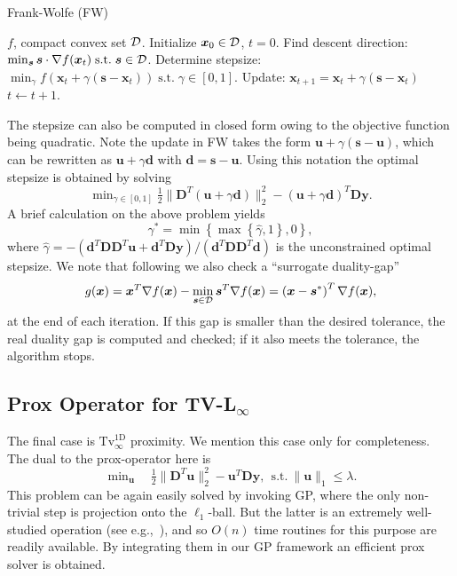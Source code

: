\documentclass[twoside,11pt]{article}
\newcommand{\vd}{\bm{d}}       \newcommand{\vdh}{\hat{\bm{d}}}        \newcommand{\dhat}{\hat{d}}  \newcommand{\vdt}{\tilde{\bm{d}}}       \newcommand{\dt}{\tilde{d}}
\newcommand{\vs}{\bm{s}}       \newcommand{\vsh}{\hat{\bm{s}}}        \newcommand{\sh}{\hat{s}}    \newcommand{\vst}{\tilde{\bm{s}}}       \newcommand{\st}{\tilde{s}}
\newcommand{\vu}{\bm{u}}       \newcommand{\vuh}{\hat{\bm{u}}}        \newcommand{\uh}{\hat{u}}    \newcommand{\vut}{\tilde{\bm{u}}}       \newcommand{\ut}{\tilde{u}}
\newcommand{\vx}{\bm{x}}       \newcommand{\vxh}{\hat{\bm{x}}}        \newcommand{\xh}{\hat{x}}    \newcommand{\vxt}{\tilde{\bm{x}}}       \newcommand{\xt}{\tilde{x}}
\newcommand{\vy}{\bm{y}}       \newcommand{\vyh}{\hat{\bm{y}}}        \newcommand{\yh}{\hat{y}}    \newcommand{\vyt}{\tilde{\bm{y}}}       \newcommand{\yt}{\tilde{y}}
\newcommand{\md}{\bm{D}}
\newcommand{\mynorm}[2]{\| {#1} \|_{#2}}
\newcommand{\norm}[2]{\mynorm{#1}{#2}}
\newcommand{\enorm}[1]{\mynorm{#1}{2}}
\newcommand{\nlmin}{\min\nolimits}
\newcommand{\half}{\tfrac{1}{2}}
\newcommand{\tvell}{\text{Tv}}
\newcommand{\oned}{\text{1D}}
\numberwithin{equation}{section}
\numberwithin{theorem}{section}
\begin{document}
\begin{algorithm}[htbp]
 \caption{
    \label{alg:FW}
    Frank-Wolfe (FW)
 }
 \begin{algorithmic}
   $f$, compact convex set ${\cal D}$.
  \State Initialize $\vx_0 \in {\cal D}$, $t=0$.
   \State Find descent direction: $\min_{\vs} \vs \cdot \nabla f (\vx_t) \; \text{s.t.} \; \vs \in {\cal D}$.
   \State Determine stepsize: $\min_{\gamma} f(\vx_t + \gamma (\vs - \vx_t)) \; \text{s.t.} \; \gamma \in [0, 1]$.
   \State Update: $\vx_{t+1} = \vx_t + \gamma (\vs - \vx_t)$
   \State $t \gets t+1$.
  \EndWhile
  \State\Return{$\vx_t$.}
 \end{algorithmic}
\end{algorithm}

The stepsize can also be computed in closed form owing to the objective function being quadratic. Note the update in FW  takes the form $\vu + \gamma (\vs - \vu)$, which can be rewritten as $\vu + \gamma \vd$ with $\vd = \vs - \vu$. Using this notation the optimal stepsize is obtained by solving
\begin{equation*}
 \nlmin_{\gamma \in [0, 1]} \half \enorm{\md^T (\vu + \gamma \vd)}^2 - \left( \vu + \gamma \vd\right)^T \md \vy.
\end{equation*}
A brief calculation on the above problem yields %
\begin{equation*}
 \gamma^* = \min \left\lbrace \max \left\lbrace \hat\gamma, 1 \right\rbrace, 0 \right\rbrace,
\end{equation*}
where $\hat{\gamma} = - (\vd^T \md \md^T \vu + \vd^T \md \vy)/(\vd^T \md \md^T \vd)$ is the unconstrained optimal stepsize. We note that following \citep{JaggiFW} we
also check a ``surrogate duality-gap''
\begin{equation*}
 g(\vx)  = \vx^T \nabla f(\vx) - \min_{\vs \in {\cal D}} \vs^T \nabla f(\vx)
         = \left( \vx - \vs^* \right)^T \nabla f(\vx),
\end{equation*}
at the end of each iteration. If this gap is smaller than the desired tolerance, the real duality gap is computed and checked; if it also meets the tolerance, the algorithm stops.

\subsection{Prox Operator for TV-L$_\infty$}
The final case is $\tvell_{\infty}^{\oned}$ proximity. We mention this case only for completeness. The dual to the prox-operator here is
\begin{equation}
  \label{eq:20}
  \nlmin_{\vu}\quad\half\enorm{\md^T\vu}^2 - \vu^T\md\vy,\ \ \text{s.t.}\ \norm{\vu}{1} \le \lambda.
\end{equation}
This problem can be again easily solved by invoking GP, where the only non-trivial step is projection onto the $\ell_1$-ball. But the latter is an extremely well-studied operation (see e.g.,~\citet{condatl1,liu09,kiwiel}), and so $O(n)$ time routines for this purpose are readily available. By integrating them in our GP framework an efficient prox solver is obtained.
\end{document}

